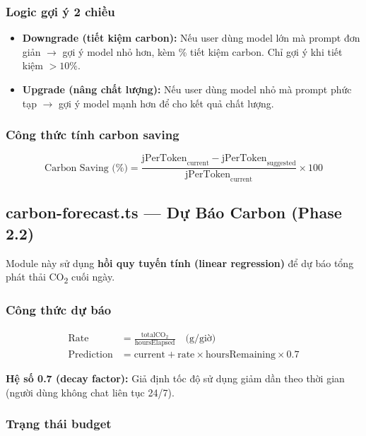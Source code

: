 \documentclass[12pt,a4paper]{article}
\begin{document}
\subsubsection{Logic gợi ý 2 chiều}

\begin{itemize}
    \item \textbf{Downgrade (tiết kiệm carbon):} Nếu user dùng model lớn mà prompt đơn giản $\rightarrow$ gợi ý model nhỏ hơn, kèm \% tiết kiệm carbon. Chỉ gợi ý khi tiết kiệm $>10\%$.
    \item \textbf{Upgrade (nâng chất lượng):} Nếu user dùng model nhỏ mà prompt phức tạp $\rightarrow$ gợi ý model mạnh hơn để cho kết quả chất lượng.
\end{itemize}

\subsubsection{Công thức tính carbon saving}

\begin{equation}
    \text{Carbon Saving (\%)} = \frac{\text{jPerToken}_{\text{current}} - \text{jPerToken}_{\text{suggested}}}{\text{jPerToken}_{\text{current}}} \times 100
\end{equation}

\subsection{carbon-forecast.ts — Dự Báo Carbon (Phase 2.2)}

Module này sử dụng \textbf{hồi quy tuyến tính (linear regression)} để dự báo tổng phát thải CO\textsubscript{2} cuối ngày.

\subsubsection{Công thức dự báo}

\begin{align}
    \text{Rate} &= \frac{\text{totalCO}_2}{\text{hoursElapsed}} \quad \text{(g/giờ)} \\
    \text{Prediction} &= \text{current} + \text{rate} \times \text{hoursRemaining} \times 0.7
\end{align}

\textbf{Hệ số 0.7 (decay factor):} Giả định tốc độ sử dụng giảm dần theo thời gian (người dùng không chat liên tục 24/7).

\subsubsection{Trạng thái budget}
\end{document}
